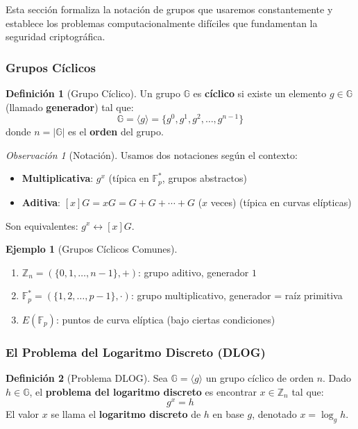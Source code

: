 \documentclass[11pt,a4paper,twoside,openright]{book}
\theoremstyle{definition}
\newtheorem{definition}{Definición}[chapter]
\newtheorem{example}{Ejemplo}[chapter]
\theoremstyle{plain}
\theoremstyle{remark}
\newtheorem{remark}{Observación}[chapter]
\begin{document}
Esta sección formaliza la notación de grupos que usaremos constantemente y establece los problemas computacionalmente difíciles que fundamentan la seguridad criptográfica.

\subsubsection{Grupos Cíclicos}

\begin{definition}[Grupo Cíclico]
Un grupo $\mathbb{G}$ es \textbf{cíclico} si existe un elemento $g \in \mathbb{G}$ (llamado \textbf{generador}) tal que:
\[ \mathbb{G} = \langle g \rangle = \{g^0, g^1, g^2, \ldots, g^{n-1}\} \]
donde $n = |\mathbb{G}|$ es el \textbf{orden} del grupo.
\end{definition}

\begin{remark}[Notación]
Usamos dos notaciones según el contexto:
\begin{itemize}
    \item \textbf{Multiplicativa}: $g^x$ (típica en $\mathbb{F}_p^*$, grupos abstractos)
    \item \textbf{Aditiva}: $[x]G = xG = G + G + \cdots + G$ ($x$ veces) (típica en curvas elípticas)
\end{itemize}
Son equivalentes: $g^x \leftrightarrow [x]G$.
\end{remark}

\begin{example}[Grupos Cíclicos Comunes]
\begin{enumerate}
    \item $\mathbb{Z}_n = (\{0, 1, \ldots, n-1\}, +)$: grupo aditivo, generador $1$
    \item $\mathbb{F}_p^* = (\{1, 2, \ldots, p-1\}, \cdot)$: grupo multiplicativo, generador = raíz primitiva
    \item $E(\mathbb{F}_p)$: puntos de curva elíptica (bajo ciertas condiciones)
\end{enumerate}
\end{example}

\subsubsection{El Problema del Logaritmo Discreto (DLOG)}

\begin{definition}[Problema DLOG]
Sea $\mathbb{G} = \langle g \rangle$ un grupo cíclico de orden $n$. Dado $h \in \mathbb{G}$, el \textbf{problema del logaritmo discreto} es encontrar $x \in \mathbb{Z}_n$ tal que:
\[ g^x = h \]
El valor $x$ se llama el \textbf{logaritmo discreto} de $h$ en base $g$, denotado $x = \log_g h$.
\end{definition}
\end{document}
